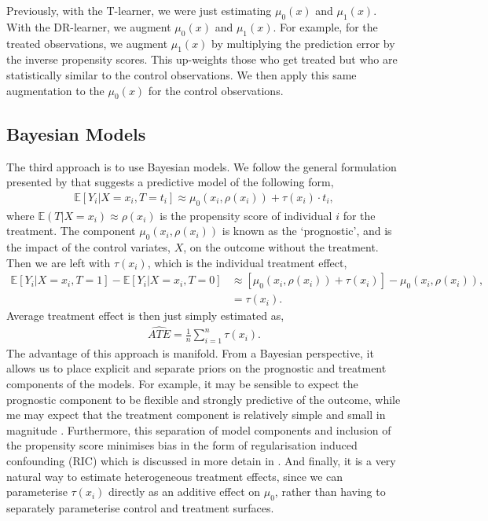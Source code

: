\documentclass[12pt, a4paper]{article}
\begin{document}
Previously, with the T-learner, we were just estimating $\mu_0(x)$ and $\mu_1(x)$. With the DR-learner, we augment $\mu_0(x)$ and $\mu_1(x)$. For example, for the treated observations, we augment $\mu_1(x)$ by multiplying the prediction error by the inverse propensity scores. This up-weights those who get treated but who are statistically similar to the control observations. We then apply this same augmentation to the $\mu_0(x)$ for the control observations. 


\subsection{Bayesian Models}

The third approach is to use Bayesian models. We follow the general formulation
presented by \cite{hahn2020} that suggests a predictive model of the following
form,
\begin{align}
  \mathbb{E}[Y_i|X{=}x_i, T{=}t_i] \approx \mu_0(x_i, \rho(x_i)) 
    + \tau(x_i)\cdot t_i, \label{eq:bayesmods}
\end{align}
where $\mathbb{E}(T|X{=}x_i) \approx \rho(x_i)$ is the propensity score of
individual $i$ for the treatment. The component $\mu_0(x_i, \rho(x_i))$ is
known as the `prognostic', and is the impact of the control variates, $X$, on
the outcome without the treatment. Then we are left with $\tau(x_i)$, which is
the individual treatment effect,
\begin{align*}
  \mathbb{E}[Y_i|X{=}x_i, T{=}1] - \mathbb{E}[Y_i|X{=}x_i, T{=}0] &\approx 
    \left[\mu_0(x_i, \rho(x_i)) + \tau(x_i)\right] - \mu_0(x_i, \rho(x_i)), \\
    &=\tau(x_i).
\end{align*}
Average treatment effect is then just simply estimated as,
\begin{align*}
  \hat{ATE} = \frac{1}{n}\sum^n_{i=1} \tau(x_i).
\end{align*}
The advantage of this approach is manifold. From a Bayesian perspective, it
allows us to place explicit and separate priors on the prognostic and treatment
components of the models. For example, it may be sensible to expect the
prognostic component to be flexible and strongly predictive of the outcome,
while me may expect that the treatment component is relatively simple and small
in magnitude \citep{hahn2020}. Furthermore, this separation of model components
and inclusion of the propensity score minimises bias in the form of
regularisation induced confounding (RIC) which is discussed in more detain in
\citep{hahn2018, hahn2020}. And finally, it is a very natural way to estimate
heterogeneous treatment effects, since we can parameterise $\tau(x_i)$
directly as an additive effect on $\mu_0$, rather than having to separately 
parameterise control and treatment surfaces.
\end{document}
